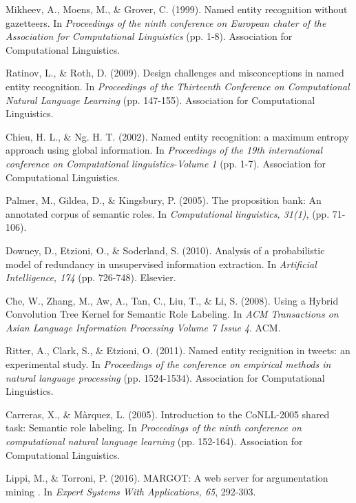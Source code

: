 \documentclass[12pt,a4paper]{article}
\begin{document}
\begin{thebibliography}{9}
  Mikheev, A., Moens, M., \& Grover, C. (1999). Named entity recognition without gazetteers. In \textit{Proceedings of the ninth conference on European chater of the Association for Computational Linguistics} (pp. 1-8). Association for Computational Linguistics.
  
  Ratinov, L., \& Roth, D. (2009). Design challenges and misconceptions in named entity recognition. In \textit{Proceedings of the Thirteenth Conference on Computational Natural Language Learning} (pp. 147-155). Association for Computational Linguistics.
  
  Chieu, H. L., \& Ng. H. T. (2002). Named entity recognition: a maximum entropy approach using global information. In \textit{Proceedings of the 19th international conference on Computational linguistics-Volume 1} (pp. 1-7). Association for Computational Linguistics.
  
  Palmer, M., Gildea, D., \& Kingsbury, P. (2005). The proposition bank: An annotated corpus of semantic roles. In \textit{Computational linguistics, 31(1)}, (pp. 71-106).
  
  Downey, D., Etzioni, O., \& Soderland, S. (2010). Analysis of a probabilistic model of redundancy in unsupervised information extraction. In \textit{Artificial Intelligence, 174} (pp. 726-748). Elsevier.
  
  Che, W., Zhang, M., Aw, A., Tan, C., Liu, T., \& Li, S. (2008). Using a Hybrid Convolution Tree Kernel for Semantic Role Labeling. In \textit{ACM Transactions on Asian Language Information Processing Volume 7 Issue 4}. ACM.

  Ritter, A., Clark, S., \& Etzioni, O. (2011).
  Named entity recignition in tweets: an experimental study. In \textit{Proceedings of the conference on empirical methods in natural language processing} (pp. 1524-1534). Association for Computational Linguistics.
  
  Carreras, X., \& Màrquez, L. (2005). Introduction to the CoNLL-2005 shared task: Semantic role labeling. In \textit{Proceedings of the ninth conference on computational natural language learning} (pp. 152-164). Association for Computational Linguistics.
  
  Lippi, M., \& Torroni, P. (2016). MARGOT: A web server for argumentation mining . In \textit{Expert Systems With Applications, 65}, 292-303.
  

\end{thebibliography}
\end{document}
